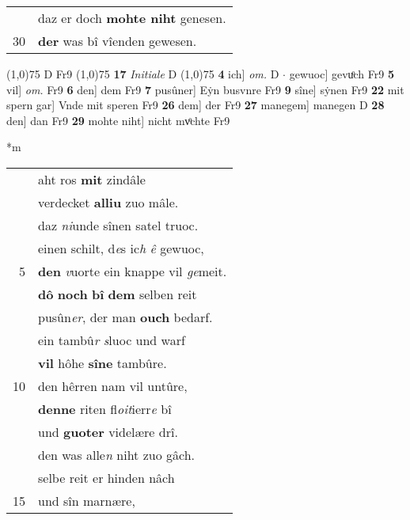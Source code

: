 \documentclass[8pt,a4paper,notitlepage]{article}
\begin{document}
\begin{table}[ht]
\begin{minipage}[t]{0.5\linewidth}
\begin{tabular}{rl}
 & daz er doch \textbf{mohte niht} genesen.\\ 
30 & \textbf{der} was bî vîenden gewesen.\\ 
\end{tabular}
\scriptsize
\line(1,0){75} \newline
D Fr9 \newline
\line(1,0){75} \newline
\textbf{17} \textit{Initiale} D  \newline
\line(1,0){75} \newline
\textbf{4} ich] \textit{om.} D  $\cdot$ gewuoc] gevuͦch Fr9 \textbf{5} vil] \textit{om.} Fr9 \textbf{6} den] dem Fr9 \textbf{7} pusûner] Eẏn busvnre Fr9 \textbf{9} sîne] sẏnen Fr9 \textbf{22} mit spern gar] Vnde mit speren Fr9 \textbf{26} dem] der Fr9 \textbf{27} manegem] manegen D \textbf{28} den] dan Fr9 \textbf{29} mohte niht] nicht mvͦchte Fr9 \newline
\end{minipage}
\hspace{0.5cm}
\begin{minipage}[t]{0.5\linewidth}
\small
\begin{center}*m
\end{center}
\begin{tabular}{rl}
 & aht ros \textbf{mit} zindâle\\ 
 & verdecket \textbf{alliu} zuo mâle.\\ 
 & daz \textit{ni}unde sînen satel truoc.\\ 
 & einen schilt, d\textit{e}s ic\textit{h} \textit{ê} gewuoc,\\ 
5 & \textbf{den} \textit{v}uorte ein knappe vil \textit{ge}meit.\\ 
 & \textbf{dô} \textbf{noch} \textbf{bî} \textbf{dem} selben reit\\ 
 & pusûn\textit{er}, der man \textbf{ouch} bedarf.\\ 
 & ein tambû\textit{r} \textit{s}luoc und warf\\ 
 & \textbf{vil} hôhe \textbf{sîne} tambûre.\\ 
10 & den hêrren nam vil untûre,\\ 
 & \textbf{denne} riten fl\textit{oit}ierr\textit{e} bî\\ 
 & und \textbf{guoter} videlære drî.\\ 
 & den was alle\textit{n} niht zuo gâch.\\ 
 & selbe reit er hinden nâch\\ 
15 & und sîn marnære,\\ 

\end{tabular}
\end{minipage}
\end{table}
\end{document}
